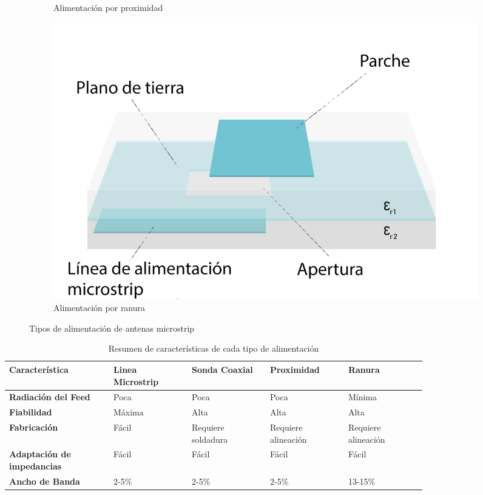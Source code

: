 \begin{figure}[h]
\begin{subfigure}[b]{0.45\textwidth}
         \caption{Alimentación por proximidad}
         \label{fig:proximidad}
     \end{subfigure}
     \hfill
     \begin{subfigure}[b]{0.45\textwidth}
         \centering
         \includegraphics[width=\textwidth]{archivos/parche/apertura}
         \caption{Alimentación por ranura}
         \label{fig:ranura}
     \end{subfigure}
        \caption{Tipos de alimentación de antenas microstrip}
        \label{fig:sistemas}
\end{figure}

\begin{table}[H]
   
   \label{tab:example}
   \small %
   \centering %
   \begin{tabular}{m{0.2\linewidth}m{0.15\linewidth}m{0.15\linewidth}m{0.15\linewidth}m{0.15\linewidth}} %
   \toprule[\heavyrulewidth]\toprule[\heavyrulewidth]
   \textbf{Característica} & \textbf{Linea Microstrip} & \textbf{Sonda Coaxial} & \textbf{Proximidad} & \textbf{Ranura} \\ 
   \midrule
   \textbf{Radiación del Feed} & Poca & Poca & Poca & Mínima \\
   \textbf{Fiabilidad} & Máxima & Alta & Alta & Alta \\
   \textbf{Fabricación} & Fácil & Requiere soldadura & Requiere alineación & Requiere alineación \\
   \textbf{Adaptación de impedancias} & Fácil & Fácil & Fácil & Fácil \\
   \textbf{Ancho de Banda} & 2-5\% & 2-5\% & 2-5\% & 13-15\% \\
   
   \bottomrule[\heavyrulewidth] 
   \end{tabular}
   \caption{Resumen de características de cada tipo de alimentación} 
\end{table}



